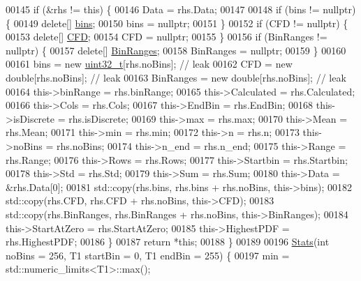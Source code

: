 \begin{DoxyCode}
00145     \textcolor{keywordflow}{if} (&rhs != \textcolor{keyword}{this}) \{
00146       Data = rhs.Data;
00147 
00148       \textcolor{keywordflow}{if} (bins != \textcolor{keyword}{nullptr}) \{
00149         \textcolor{keyword}{delete}[] \hyperlink{class_soil_math_1_1_stats_a00778b298b1ebb335eb0c4eed69e471c}{bins};
00150         bins = \textcolor{keyword}{nullptr};
00151       \}
00152       \textcolor{keywordflow}{if} (CFD != \textcolor{keyword}{nullptr}) \{
00153         \textcolor{keyword}{delete}[] \hyperlink{class_soil_math_1_1_stats_a0d68c6fb52cb445c413aa187038bb1fe}{CFD};
00154         CFD = \textcolor{keyword}{nullptr};
00155       \}
00156       \textcolor{keywordflow}{if} (BinRanges != \textcolor{keyword}{nullptr}) \{
00157         \textcolor{keyword}{delete}[] \hyperlink{class_soil_math_1_1_stats_a0d452c96b6f499f054432bd3b52d1302}{BinRanges};
00158         BinRanges = \textcolor{keyword}{nullptr};
00159       \}
00160 
00161       bins = \textcolor{keyword}{new} \hyperlink{_soil_math_types_8h_a435d1572bf3f880d55459d9805097f62}{uint32\_t}[rhs.noBins];    \textcolor{comment}{// leak}
00162       CFD = \textcolor{keyword}{new} \textcolor{keywordtype}{double}[rhs.noBins];       \textcolor{comment}{// leak}
00163       BinRanges = \textcolor{keyword}{new} \textcolor{keywordtype}{double}[rhs.noBins]; \textcolor{comment}{// leak}
00164       this->binRange = rhs.binRange;
00165       this->Calculated = rhs.Calculated;
00166       this->Cols = rhs.Cols;
00167       this->EndBin = rhs.EndBin;
00168       this->isDiscrete = rhs.isDiscrete;
00169       this->max = rhs.max;
00170       this->Mean = rhs.Mean;
00171       this->min = rhs.min;
00172       this->n = rhs.n;
00173       this->noBins = rhs.noBins;
00174       this->n\_end = rhs.n\_end;
00175       this->Range = rhs.Range;
00176       this->Rows = rhs.Rows;
00177       this->Startbin = rhs.Startbin;
00178       this->Std = rhs.Std;
00179       this->Sum = rhs.Sum;
00180       this->Data = &rhs.Data[0];
00181       std::copy(rhs.bins, rhs.bins + rhs.noBins, this->bins);
00182       std::copy(rhs.CFD, rhs.CFD + rhs.noBins, this->CFD);
00183       std::copy(rhs.BinRanges, rhs.BinRanges + rhs.noBins, this->BinRanges);
00184       this->StartAtZero = rhs.StartAtZero;
00185       this->HighestPDF = rhs.HighestPDF;
00186     \}
00187     \textcolor{keywordflow}{return} *\textcolor{keyword}{this};
00188   \}
00189 
00196   \hyperlink{class_soil_math_1_1_stats_aa9727b7ea39b46f8a010a7b710b26d83}{Stats}(\textcolor{keywordtype}{int} noBins = 256, T1 startBin = 0, T1 endBin = 255) \{
00197     min = std::numeric\_limits<T1>::max();

\end{DoxyCode}
